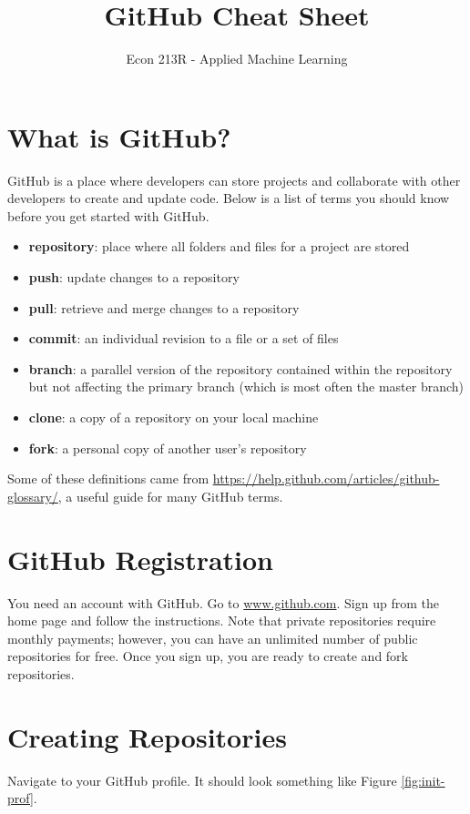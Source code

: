 \documentclass[11pt,a4paper]{article}
\title{GitHub Cheat Sheet}
\date{}
\author{Econ 213R - Applied Machine Learning}
\begin{document}
\vspace*{-75pt}
    {\let\newpage\relax\maketitle}
    
\tableofcontents
    
\section{What is GitHub?}
GitHub is a place where developers can store projects and collaborate with other developers to create and update code.
Below is a list of terms you should know before you get started with GitHub.

\begin{itemize}
\item \textbf{repository}: place where all folders and files for a project are stored
\item \textbf{push}: update changes to a repository
\item \textbf{pull}: retrieve and merge changes to a repository
\item \textbf{commit}: an individual revision to a file or a set of files
\item \textbf{branch}: a parallel version of the repository contained within the repository but not affecting the primary branch (which is most often the master branch)
\item \textbf{clone}: a copy of a repository on your local machine
\item \textbf{fork}: a personal copy of another user's repository
\end{itemize}

Some of these definitions came from \url{https://help.github.com/articles/github-glossary/}, a useful guide for many GitHub terms.
    
\section{GitHub Registration}
You need an account with GitHub.
Go to \url{www.github.com}. 
Sign up from the home page and follow the instructions.
Note that private repositories require monthly payments; however, you can have an unlimited number of public repositories for free.
Once you sign up, you are ready to create and fork repositories.

\section{Creating Repositories}
Navigate to your GitHub profile.
It should look something like Figure \ref{fig:init-prof}.
\end{document}
